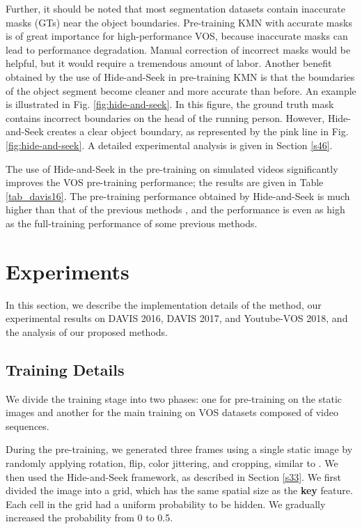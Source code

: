 \documentclass[runningheads]{llncs}
\begin{document}
Further, it should be noted that most segmentation datasets contain inaccurate masks (GTs) near the object boundaries. Pre-training KMN with accurate masks is of great importance for high-performance VOS, because inaccurate masks can lead to performance degradation. Manual correction of incorrect masks would be helpful, but it would require a tremendous amount of labor. Another benefit obtained by the use of Hide-and-Seek in pre-training KMN is that the boundaries of the object segment become cleaner and more accurate than before. An example is illustrated in Fig. \ref{fig:hide-and-seek}. In this figure, the ground truth mask contains incorrect boundaries on the head of the running person. However, Hide-and-Seek creates a clear object boundary, as represented by the pink line in Fig. \ref{fig:hide-and-seek}. A detailed experimental analysis is given in Section \ref{s46}.

The use of Hide-and-Seek in the pre-training on simulated videos significantly improves the VOS pre-training performance; the results are given in Table \ref{tab_davis16}. The pre-training performance obtained by Hide-and-Seek is much higher than that of the previous methods \cite{wug2018fast,Oh_2019_ICCV}, and the performance is even as high as the full-training performance of some previous methods.



\section{Experiments}
\label{s4}
In this section, we describe the implementation details of the method, our experimental results on DAVIS 2016, DAVIS 2017, and Youtube-VOS 2018, and the analysis of our proposed methods.

\subsection{Training Details}
\label{s41}
We divide the training stage into two phases: one for pre-training on the static images and another for the main training on VOS datasets composed of video sequences.

During the pre-training, we generated three frames using a single static image by randomly applying rotation, flip, color jittering, and cropping, similar to \cite{wug2018fast,Oh_2019_ICCV}. We then used the Hide-and-Seek framework, as described in Section \ref{s33}. We first divided the image into a  grid, which has the same spatial size as the \textbf{key} feature. Each cell in the grid had a uniform probability to be hidden. We gradually increased the probability from 0 to 0.5.
\end{document}
